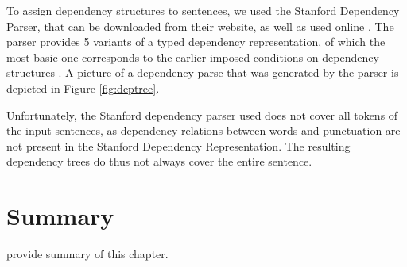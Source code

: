 \documentclass[hidelinks]{report}
\begin{document}
To assign dependency structures to sentences, we used the Stanford Dependency Parser, that can be downloaded from their website, as well as used online  \citep{de2006generating}. The parser provides 5 variants of a typed dependency representation, of which the most basic one corresponds to the earlier imposed conditions on dependency structures \citep{de2008stanford}. A picture of a dependency parse that was generated by the parser is depicted in Figure \ref{fig:deptree}.

Unfortunately, the Stanford dependency parser used does not cover all tokens of the input sentences, as dependency relations between words and punctuation are not present in the Stanford Dependency Representation. The resulting dependency trees do thus not always cover the entire sentence.

\section{Summary}

provide summary of this chapter.


\end{document}
